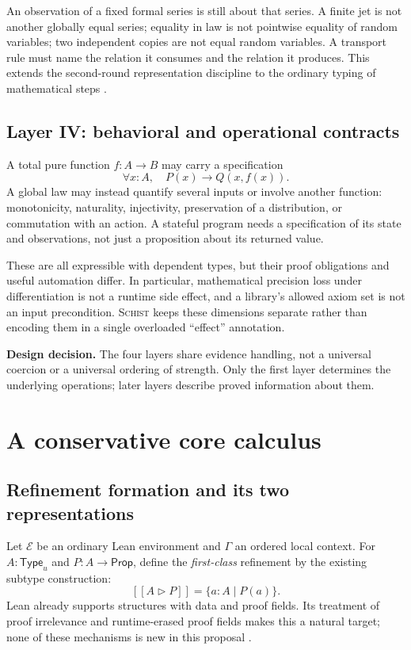 \documentclass[11pt,a4paper]{article}
\newcommand{\Schist}{\textsc{Schist}}
\newcommand{\Prop}{\mathsf{Prop}}
\newcommand{\Type}{\mathsf{Type}}
\newcommand{\RType}[2]{#1\mathbin{\triangleright}#2}
\newcommand{\sem}[1]{[\![#1]\!]}
\newcommand{\result}[1]{\par\smallskip\textbf{Design decision.} #1\par\smallskip}
\theoremstyle{definition}
\begin{document}
An observation of a fixed formal series is still about that series. A finite
jet is not another globally equal series; equality in law is not pointwise
equality of random variables; two independent copies are not equal random
variables. A transport rule must name the relation it consumes and the relation
it produces. This extends the second-round representation discipline to the
ordinary typing of mathematical steps \cite{round2a,round2b}.

\subsection{Layer IV: behavioral and operational contracts}
A total pure function $f:A\to B$ may carry a specification
\[
 \forall x:A,\quad P(x)\longrightarrow Q(x,f(x)).
\]
A global law may instead quantify several inputs or involve another function:
monotonicity, naturality, injectivity, preservation of a distribution, or
commutation with an action. A stateful program needs a specification of its
state and observations, not just a proposition about its returned value.

These are all expressible with dependent types, but their proof obligations
and useful automation differ. In particular, mathematical precision loss under
differentiation is not a runtime side effect, and a library's allowed axiom set
is not an input precondition. \Schist{} keeps these dimensions separate rather
than encoding them in a single overloaded ``effect'' annotation.

\result{The four layers share evidence handling, not a universal coercion or a
universal ordering of strength. Only the first layer determines the underlying
operations; later layers describe proved information about them.}

\section{A conservative core calculus}\label{sec:calculus}
\subsection{Refinement formation and its two representations}
Let $\mathcal E$ be an ordinary Lean environment and $\Gamma$ an ordered local
context. For $A:\Type_u$ and $P:A\to\Prop$, define the \emph{first-class}
refinement by the existing subtype construction:
\begin{equation}\label{eq:refine}
 \sem{\RType{A}{P}}=\{a:A\mid P(a)\}.
\end{equation}
Lean already supports structures with data and proof fields. Its treatment of
proof irrelevance and runtime-erased proof fields makes this a natural target;
none of these mechanisms is new in this proposal \cite{leantypes}.
\end{document}
